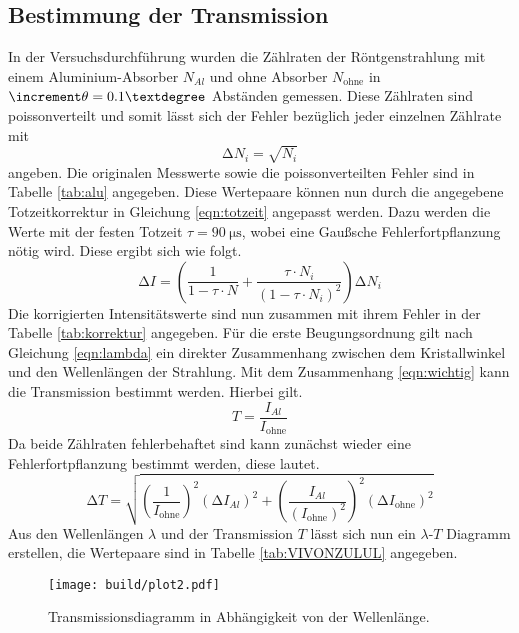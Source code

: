 \subsection{Bestimmung der Transmission}
In der Versuchsdurchführung wurden die Zählraten der Röntgenstrahlung mit einem Aluminium-Absorber $N_{Al}$ und ohne Absorber $N_{\text{ohne}}$ in $\increment \theta= 0.1\textdegree$ Abständen gemessen.
Diese Zählraten sind poissonverteilt und somit lässt sich der Fehler bezüglich jeder einzelnen Zählrate mit
\begin{equation*}
\increment N_{i} = \sqrt{N_{i}}
\end{equation*}
angeben. Die originalen Messwerte sowie die poissonverteilten Fehler sind in Tabelle \ref{tab:alu} angegeben. Diese Wertepaare können nun durch die angegebene Totzeitkorrektur in Gleichung \eqref{eqn:totzeit}
angepasst werden. Dazu werden die Werte mit der festen Totzeit $\tau = \SI{90}{\micro\second}$, wobei eine Gaußsche Fehlerfortpflanzung nötig wird. Diese ergibt sich wie folgt.
\begin{equation*}
\increment I = \left( \frac{1}{1 - \tau \cdot N} + \frac{\tau \cdot N_{i}}{(1 - \tau \cdot N_{i})^{2}} \right) \increment N_{i}
\end{equation*}
Die korrigierten Intensitätswerte sind nun zusammen mit ihrem Fehler in der Tabelle \ref{tab:korrektur} angegeben.
Für die erste Beugungsordnung gilt nach Gleichung \ref{eqn:lambda} ein direkter Zusammenhang zwischen dem Kristallwinkel und den Wellenlängen der Strahlung.
Mit dem Zusammenhang \eqref{eqn:wichtig} kann die Transmission bestimmt werden. Hierbei gilt.
\begin{equation*}
T = \frac{I_{Al}}{I_{\text{ohne}}}
\end{equation*}
Da beide Zählraten fehlerbehaftet sind kann zunächst wieder eine Fehlerfortpflanzung bestimmt werden, diese lautet.
\begin{equation*}
\increment T = \sqrt{\left( \frac{1}{I_{\text{ohne}}}\right)^{2} (\increment I_{Al})^{2} + \left( \frac{I_{Al}}{(I_{\text{ohne}})^{2}}\right)^{2} (\increment I_{\text{ohne}})^{2}}
\end{equation*}
Aus den Wellenlängen $\lambda$ und der Transmission $T$ lässt sich nun ein $\lambda$-$T$ Diagramm erstellen, die Wertepaare sind in Tabelle \ref{tab:VIVONZULUL} angegeben.

\begin{figure}[h]
  \centering
  \texttt{[image: build/plot2.pdf]}
  \caption{Transmissionsdiagramm in Abhängigkeit von der Wellenlänge.}
  \label{fig:plot2}
\end{figure}

